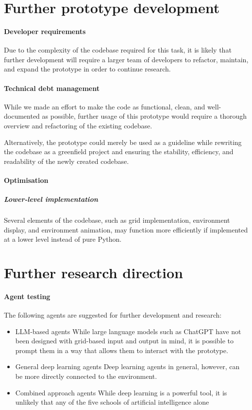 \documentclass[masterthesis]{fer}
\begin{document}
\section{Further prototype development}
\paragraph{Developer requirements}
Due to the complexity of the codebase required for this task, it is likely that further development will require a larger team of developers to refactor, maintain, and expand the prototype in order to continue research.
\paragraph{Technical debt management}
While we made an effort to make the code as functional, clean, and well-documented as possible,
further usage of this prototype would require a thorough overview and refactoring of the existing codebase.

Alternatively, the prototype could merely be used as a guideline while rewriting the codebase as a greenfield project and ensuring the stability, efficiency, and readability of the newly created codebase.
\paragraph{Optimisation}
\subparagraph{Lower-level implementation}
Several elements of the codebase, such as grid implementation, environment display, and environment animation,
may function more efficiently if implemented at a lower level instead of pure Python.
\section{Further research direction}
\paragraph{Agent testing} The following agents are suggested for further development and research:
\begin{itemize}
\item{LLM-based agents}
While large language models such as ChatGPT have not been designed with grid-based input and output in mind, it is possible to prompt them in a way that allows them to interact with the prototype.
\item{General deep learning agents}
Deep learning agents in general, however, can be more directly connected to the environment.
\item{Combined approach agents}
While deep learning is a powerful tool, it is unlikely that any of the five schools of artificial intelligence alone
\end{itemize}
\end{document}
